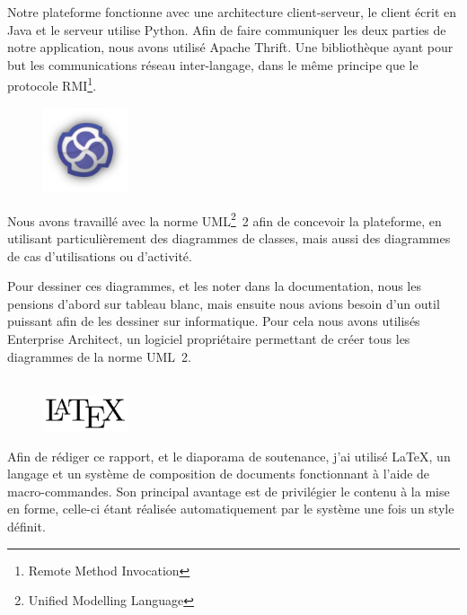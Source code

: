 Notre plateforme fonctionne avec une architecture client-serveur, le client écrit en Java et le serveur utilise Python. Afin de faire communiquer les deux parties de notre application, nous avons utilisé Apache Thrift. Une bibliothèque ayant pour but les communications réseau inter-langage, dans le même principe que le protocole RMI\footnote{Remote Method Invocation}.

\begin{figure}
	\includegraphics[width=2.5cm]{contents/images/logoEnterpriseArchitect.png}
\end{figure}
Nous avons travaillé avec la norme UML\footnote{Unified Modelling Language}~2 afin de concevoir la plateforme, en utilisant particulièrement des diagrammes de classes, mais aussi des diagrammes de cas d'utilisations ou d'activité. 

Pour dessiner ces diagrammes, et les noter dans la documentation, nous les pensions d'abord sur tableau blanc, mais ensuite nous avions besoin d'un outil puissant afin de les dessiner sur informatique. Pour cela nous avons utilisés Enterprise Architect, un logiciel propriétaire permettant de créer tous les diagrammes de la norme UML~2.\\~

\begin{figure}
	\includegraphics[width=2.5cm]{contents/images/logoLatex.png}
\end{figure}
Afin de rédiger ce rapport, et le diaporama de soutenance, j'ai utilisé \LaTeX{}, un langage et un système de composition de documents fonctionnant à l'aide de
macro-commandes. Son principal avantage est de privilégier le contenu à la mise en forme, celle-ci étant réalisée automatiquement par le système une fois un style définit. 
